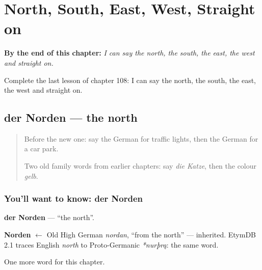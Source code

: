 
\chapter{North, South, East, West, Straight on}
\label{ch:ge-north-south-east-west-straight-on}

\begin{chapteropening}
\textbf{By the end of this chapter:} \emph{I can say the north, the south, the east, the west and straight on.}

Complete the last lesson of chapter 108: I can say the north, the south, the east, the west and straight on.
\end{chapteropening}

\section[der Norden]{der Norden — the north}

\label{lesson:GE-C108-norden}



\begin{quote}
Before the new one: say the German for traffic lights, then the German for a car park.

Two old family words from earlier chapters: say \emph{die Katze}, then the colour \emph{gelb}.
\end{quote}

\subsection*{You'll want to know: der Norden}
\textbf{der Norden} — \textquotedblleft{}the north\textquotedblright{}.

\begin{cousinweb}
\textbf{Norden} $\leftarrow$ Old High German \emph{nordan}, \textquotedblleft{}from the north\textquotedblright{} — inherited. EtymDB 2.1 traces English \emph{north} to Proto-Germanic \emph{*nurþrą}: the same word.
\end{cousinweb}

\begin{grammarlens}[title={What you've built}]
One more word for this chapter.
\end{grammarlens}


